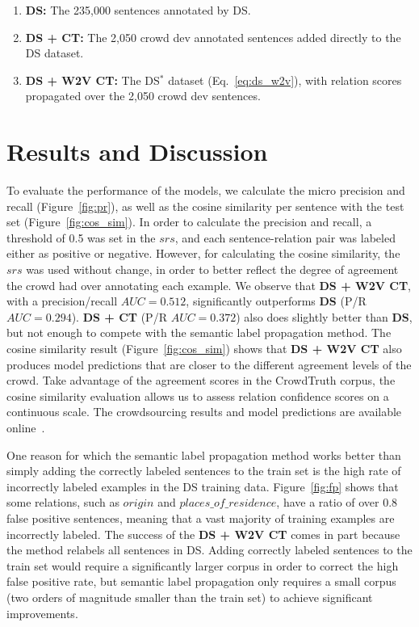 \begin{enumerate}
\item \textbf{DS:} The 235,000 sentences annotated by DS.
\item \textbf{DS + CT:} The 2,050 crowd dev annotated sentences added directly to the DS dataset.
\item \textbf{DS + W2V CT:} The DS$^{*}$ dataset (Eq.~\ref{eq:ds_w2v}), with relation scores propagated over the 2,050 crowd dev sentences.
\end{enumerate}

\section{Results and Discussion}

To evaluate the performance of the models, we calculate the micro precision and recall (Figure~\ref{fig:pr}), as well as the cosine similarity per sentence with the test set (Figure~\ref{fig:cos_sim}).  In order to calculate the precision and recall, a threshold of 0.5 was set in the $srs$, and each sentence-relation pair was labeled either as positive or negative. However, for calculating the cosine similarity, the $srs$ was used without change, in order to better reflect the degree of agreement the crowd had over annotating each example.  We observe that \textbf{DS + W2V CT}, with a precision/recall $AUC = 0.512$, significantly outperforms \textbf{DS} (P/R $AUC = 0.294$). \textbf{DS + CT} (P/R $AUC = 0.372$) also does slightly better than \textbf{DS}, but not enough to compete with the semantic label propagation method. The cosine similarity result (Figure~\ref{fig:cos_sim}) shows that \textbf{DS + W2V CT} also produces model predictions that are closer to the different agreement levels of the crowd. Take advantage of the agreement scores in the CrowdTruth corpus, the cosine similarity evaluation allows us to assess relation confidence scores on a continuous scale. The crowdsourcing results and model predictions are available online~\cite{crowdODrelexdata2016}.

One reason for which the semantic label propagation method works better than simply adding the correctly labeled sentences to the train set is the high rate of incorrectly labeled examples in the DS training data. Figure~\ref{fig:fp} shows that some relations, such as $origin$ and $places\_of\_residence$, have a ratio of over 0.8 false positive sentences, meaning that a vast majority of training examples are incorrectly labeled.  The success of the \textbf{DS + W2V CT} comes in part because the method relabels all sentences in DS. Adding correctly labeled sentences to the train set would require a significantly larger corpus in order to correct the high false positive rate, but semantic label propagation only requires a small corpus (two orders of magnitude smaller than the train set) to achieve significant improvements.

